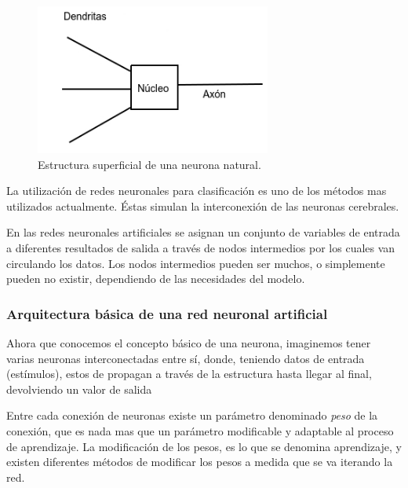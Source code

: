 \documentclass[a4paper,12pt,oneside,spanish]{book}
\begin{document}
\begin{figure}[h!]
	\includegraphics[width=220pt]{Imagenes/neurona.jpg}
	\centering
	\caption{Estructura superficial de una neurona natural.}
	\label{fig:haarlike1}
\end{figure}

La utilización de redes neuronales para clasificación es uno de los métodos mas utilizados actualmente. Éstas simulan la interconexión de las neuronas cerebrales. \par

En las redes neuronales artificiales se asignan un conjunto de variables de entrada a diferentes resultados de salida a través de nodos intermedios por los cuales van circulando los datos. Los nodos intermedios pueden ser muchos, o simplemente pueden no existir, dependiendo de las necesidades del modelo. \par

\subsubsection{Arquitectura básica de una red neuronal artificial}
Ahora que conocemos el concepto básico de una neurona, imaginemos tener varias neuronas interconectadas entre sí, donde, teniendo datos de entrada (estímulos), estos de propagan a través de la estructura hasta llegar al final, devolviendo un valor de salida\par

Entre cada conexión de neuronas existe un parámetro denominado \textit{peso} de la conexión, que es nada mas que un parámetro modificable y adaptable al proceso de aprendizaje. La modificación de los pesos, es lo que se denomina aprendizaje, y existen diferentes métodos de modificar los pesos a medida que se va iterando la red.\par
\end{document}
